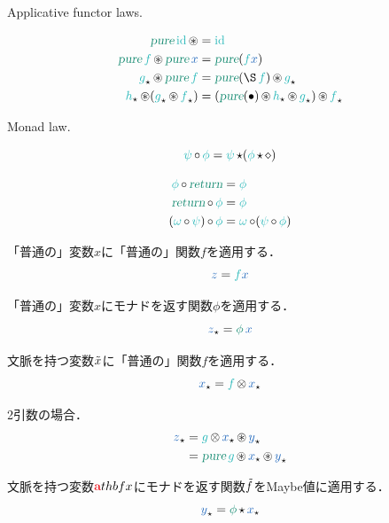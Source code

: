 \documentclass[a5paper,twoside,fleqn,draft]{jsbook}
\begin{document}
Applicative functor laws.

\begin{align}
\hPure\hId\hApplicativeMap&=\hId\\
\hPure\hFunc{f}\hApplicativeMap\hPure\hVar{x}&=\hPure(\hFunc{f}\hVar{x})\\
\hAnyContextDecor{\hFunc{g}}\hApplicativeMap\hPure\hFunc{f}&=\hPure(\hApply\hFunc{f})\hApplicativeMap\hAnyContextDecor{\hFunc{g}}\\
\hAnyContextDecor{\hFunc{h}}\hApplicativeMap(\hAnyContextDecor{\hFunc{g}}\hApplicativeMap\hAnyContextDecor{\hFunc{f}})&=(\hPure(\hCompose)\hApplicativeMap\hAnyContextDecor{\hFunc{h}}\hApplicativeMap\hAnyContextDecor{\hFunc{g}})\hApplicativeMap\hAnyContextDecor{\hFunc{f}}
\end{align}

Monad law.

\begin{equation}
\hFunc{\psi}\hMonadicCompose\hFunc{\phi}=\hFunc{\psi}\hMonadicBind(\hFunc{\phi}\hMonadicBind\hAnonParam)
\end{equation}

\begin{align}
\hFunc{\phi}\hMonadicCompose\hReturn&=\hFunc{\phi}\\
\hReturn\hMonadicCompose\hFunc{\phi}&=\hFunc{\phi}\\
(\hFunc{\omega}\hMonadicCompose\hFunc{\psi})\hMonadicCompose\hFunc{\phi}&=\hFunc{\omega}\hMonadicCompose(\hFunc{\psi}\hMonadicCompose\hFunc{\phi})
\end{align}


\separator

「普通の」変数$x$に「普通の」関数$f$を適用する．
$$
\hVar{z}=\hFunc{f}\hVar{x}
$$

「普通の」変数$x$にモナドを返す関数$\phi$を適用する．
$$
\hAnyContextVar{z}=\hAction{\phi}\hVar{x}
$$

文脈を持つ変数$\Tilde{x}$に「普通の」関数$f$を適用する．
$$
\hAnyContextVar{x}=\hFunc{f}\hFunctorMap\hAnyContextVar{x}
$$

2引数の場合．
\begin{align*}
\hAnyContextVar{z}
&=\hFunc{g}\hFunctorMap\hAnyContextVar{x}\hApplicativeMap\hAnyContextVar{y}\\
&=\hPure\hFunc{g}\hApplicativeMap\hAnyContextVar{x}\hApplicativeMap\hAnyContextVar{y}
\end{align*}

文脈を持つ変数$\hTypeName{a}thbf{x}$にモナドを返す関数$\Tilde{f}$をMaybe値に適用する．
$$
\hAnyContextVar{y}=\hAction{\phi}\hMonadicBind\hAnyContextVar{x}
$$
\end{document}
